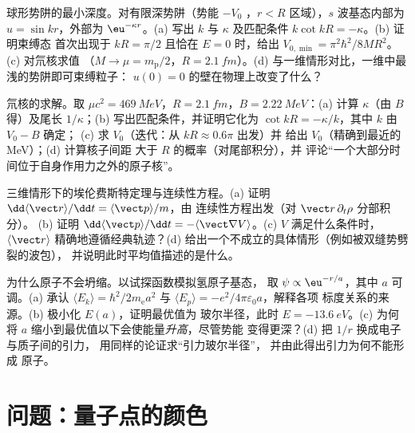 \begin{exercise}[$\star\star$]\label{exo:b3:schrodinger-three-dimensions:9}
球形势阱的最小深度。对有限深势阱（势能 $-V_0$
，$r < R$ 区域），$s$ 波基态内部为 $u = \sin kr$，外部为
$\eu^{-\kappa r}$。(a) 写出 $k$ 与 $\kappa$ 及匹配条件
$k\cot kR = -\kappa$。(b) 证明束缚态
首次出现于 $kR = \pi/2$ 且恰在 $E = 0$ 时，给出
$V_{0,\min} = \pi^2\hbar^2/8MR^2$。(c) 对氘核求值
（$M \to \mu = m_{\text{p}}/2$，$R = \qty{2.1}{fm}$）。(d)
与一维情形对比，一维中最浅的势阱即可束缚粒子：
$u(0) = 0$ 的壁在物理上改变了什么？
\end{exercise}

\begin{exercise}[$\star\star\star$]\label{exo:b3:schrodinger-three-dimensions:10}
氘核的求解。取 $\mu c^2 = \qty{469}{MeV}$，$R =
\qty{2.1}{fm}$，$B = \qty{2.22}{MeV}$：(a) 计算 $\kappa$（由 $B$
得）及尾长 $1/\kappa$；(b) 写出匹配条件，并证明它化为
$\cot kR = -\kappa/k$，其中 $k$ 由 $V_0 - B$ 确定；
(c) 求 $V_0$（迭代：从 $kR \approx 0.6\pi$ 出发）并
给出 $V_0$（精确到最近的 MeV）；(d) 计算核子间距
大于 $R$ 的概率（对尾部积分），并
评论“一个大部分时间位于自身作用力之外的原子核”。
\end{exercise}

\begin{exercise}[$\star\star\star$]\label{exo:b3:schrodinger-three-dimensions:11}
三维情形下的埃伦费斯特定理与连续性方程。(a) 证明
$\dd\langle\vect r\rangle/\dd t = \langle\vect p\rangle/m$，由
连续性方程出发（对 $\vect r\,\partial_t\rho$ 分部积分）。
(b) 证明 $\dd\langle\vect p\rangle/\dd t =
-\langle\vect\nabla V\rangle$。(c) $V$ 满足什么条件时，
$\langle\vect r\rangle$ 精确地遵循经典轨迹？(d)
给出一个不成立的具体情形（例如被双缝势劈裂的波包），
并说明此时平均值描述的是什么。
%
\end{exercise}

\begin{exercise}[$\star\star\star$]\label{exo:b3:schrodinger-three-dimensions:12}
为什么原子不会坍缩。以试探函数模拟氢原子基态，
取 $\psi \propto \eu^{-r/a}$，其中 $a$ 可调。(a)
承认 $\langle E_k\rangle = \hbar^2/2m_{\text{e}}a^2$ 与
$\langle E_p\rangle = -e^2/4\pi\varepsilon_0a$，解释各项
标度关系的来源。(b) 极小化 $E(a)$，证明最优值为
玻尔半径，此时 $E = \qty{-13.6}{eV}$。(c) 为何将 $a$
缩小到最优值以下会使能量\emph{升高}，尽管势能
变得更深？(d) 把 $1/r$ 换成电子与质子间的引力，
用同样的论证求“引力玻尔半径”，
并由此得出引力为何不能形成
原子。
\end{exercise}

\section{问题：量子点的颜色}

